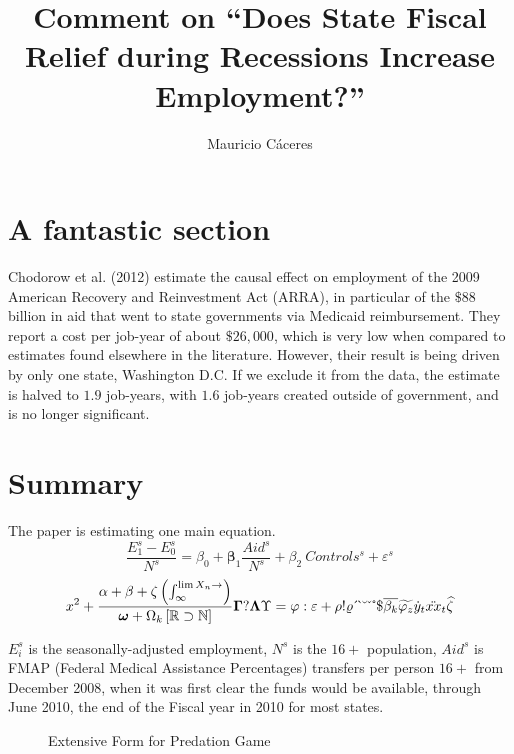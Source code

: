 \documentclass{article}
\title{Comment on ``Does State Fiscal Relief during Recessions Increase Employment?''}
\author{Mauricio C\'aceres}
\begin{document}
\displayoptions

\section{A fantastic section}
\label{sec:a_fantastic_section}

Chodorow et al. (2012) estimate the causal effect on employment of the 2009 American Recovery and Reinvestment Act (ARRA), in particular of the $\$88$ billion in aid that went to state governments via Medicaid reimbursement. They report a cost per job-year of about $\$26,000$, which is very low when compared to estimates found elsewhere in the literature. However, their result is being driven by only one state, Washington D.C. If we exclude it from the data, the estimate is halved to $1.9$ job-years, with $1.6$ job-years created outside of government, and is no longer significant.

\section{Summary}
\label{sec:summary}

The paper is estimating one main equation.
\begin{equation}
  \dfrac{E_1^s - E_0^s}{N^s}
  = \beta_0 + \bm\beta_1 \dfrac{Aid^s}{N^s} + \beta_2 ~ Controls^s + \varepsilon^s
\end{equation}
\[
  x^2 + \dfrac{\alpha + \beta + \zeta \left(\int_{\infty}^{\lim X_n \to \empty}\right)}{\bm \omega + \Omega_k \left[\mathbb{R} \supset \mathbb{N}\right]}
  \bm\Gamma ? \bm\Lambda\Upsilon = \varphi : \varepsilon + \rho ! \varrho
\acute ~ \grave ~ \breve ~ \check ~ \mathring ~ \mathdollar
\overline{\beta_k} \widetilde{\varphi_z} \dot{y}_t \ddot{xx}_t \widehat{\zeta}
\]

$E_i^s$ is the seasonally-adjusted employment, $N^s$ is the $16+$ population, $Aid^s$ is FMAP (Federal Medical Assistance Percentages) transfers per person $16+$ from December 2008, when it was first clear the funds would be available, through June 2010, the end of the Fiscal year in 2010 for most states.

\begin{figure}[!ht]
  \centering
  \caption{Extensive Form for Predation Game}
  \label{fig:extensive_form_for_predation_game}
\end{figure}
\end{document}
